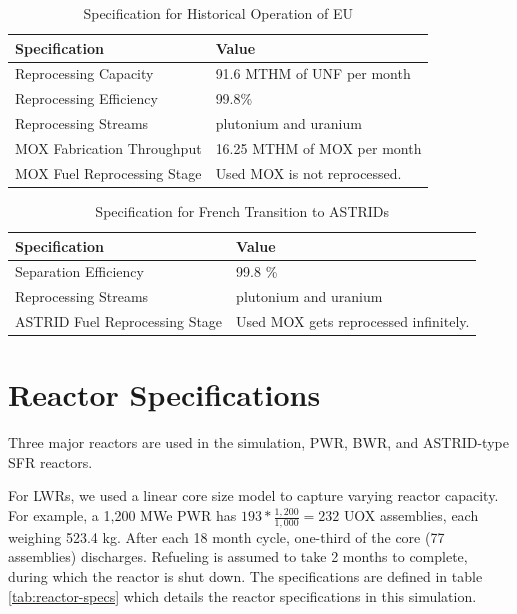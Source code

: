\begin{table}[h]
    \centering
    \begin{tabularx}{\textwidth}{bb}
        \hline
        \textbf{Specification} &\textbf{ Value} \\
        \hline
        Reprocessing Capacity & 91.6 MTHM of \gls{UNF} per month \cite{schneider_spent_2008} \\
        Reprocessing Efficiency & 99.8\% \\
        Reprocessing Streams & plutonium and uranium \\
        \gls{MOX} Fabrication Throughput & 16.25 MTHM of \gls{MOX} per month  \cite{hugelmann_melox_1999} \\
        \gls{MOX} Fuel Reprocessing Stage &  Used \gls{MOX} is not reprocessed. \\  
        \hline
    \end{tabularx}
    \caption {Specification for Historical Operation of \gls{EU}}
    \label{tab:sim_eu}
\end{table}

\begin{table}[h]
    \centering
    \begin{tabularx}{\textwidth}{bb}
        \hline
        \textbf{Specification }& \textbf{Value} \\
        \hline
        Separation Efficiency & 99.8 \% \\
        Reprocessing Streams & plutonium and uranium \\
        \gls{ASTRID} Fuel Reprocessing Stage &  Used \gls{MOX} gets reprocessed infinitely. \\
        \hline
    \end{tabularx}
    \caption {Specification for French Transition to \glspl{ASTRID} }
    \label{tab:sim_france}
\end{table}

\pagebreak

\section{Reactor Specifications}
Three major reactors are used in the simulation, \gls{PWR}, \gls{BWR}, and ASTRID-type \gls{SFR} reactors.


For \glspl{LWR}, we used a linear core size model to capture
varying reactor capacity. For example, a 
1,200 \gls{MWe} PWR has $193*\frac{1,200}{1,000} = 232$ \gls{UOX} assemblies, each
weighing 523.4 kg.
After each 18 month cycle, one-third of the 
core (77 assemblies) discharges. Refueling
is assumed to take 2 months to complete, during which the reactor
is shut down. The specifications are defined in 
table \ref{tab:reactor-specs} which details the reactor specifications in this simulation.

